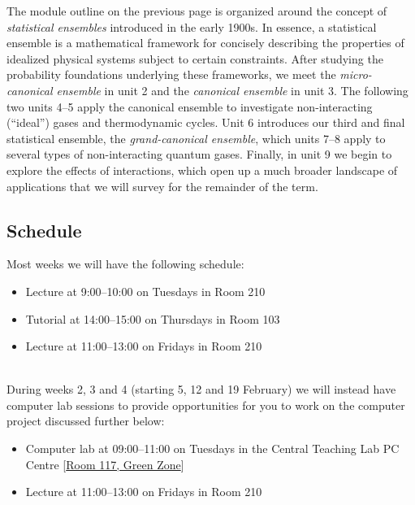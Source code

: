 The module outline on the previous page is organized around the concept of \textit{statistical ensembles} introduced in the early 1900s.
In essence, a statistical ensemble is a mathematical framework for concisely describing the properties of idealized physical systems subject to certain constraints.
After studying the probability foundations underlying these frameworks, we meet the \textit{micro-canonical ensemble} in unit 2 and the \textit{canonical ensemble} in unit 3.
The following two units 4--5 apply the canonical ensemble to investigate non-interacting (``ideal'') gases and thermodynamic cycles.
Unit 6 introduces our third and final statistical ensemble, the \textit{grand-canonical ensemble}, which units 7--8 apply to several types of non-interacting quantum gases.
Finally, in unit 9 we begin to explore the effects of interactions, which open up a much broader landscape of applications that we will survey for the remainder of the term.



\subsection*{Schedule}
Most weeks we will have the following schedule: \\[-30 pt]
\begin{itemize}
  \setlength{\itemsep}{1pt}
  \setlength{\parskip}{0pt}
  \setlength{\parsep}{0pt}
  \item Lecture at 9:00--10:00 on Tuesdays in Room 210
  \item Tutorial at 14:00–15:00 on Thursdays in Room 103
  \item Lecture at 11:00--13:00 on Fridays in Room 210
\end{itemize}
\ \\[-30 pt]
During weeks 2, 3 and 4 (starting 5, 12 and 19 February) we will instead have computer lab sessions to provide opportunities for you to work on the computer project discussed further below: \\[-30 pt]
\begin{itemize}
  \setlength{\itemsep}{1pt}
  \setlength{\parskip}{0pt}
  \setlength{\parsep}{0pt}
  \item Computer lab at 09:00--11:00 on Tuesdays in the Central Teaching Lab PC Centre [\href{https://www.liverpool.ac.uk/intranet/timetabling/online-room-catalogue/rooms/ctl-pctc-green.html}{Room 117, Green Zone}]
  \item Lecture at 11:00--13:00 on Fridays in Room 210
\end{itemize}

